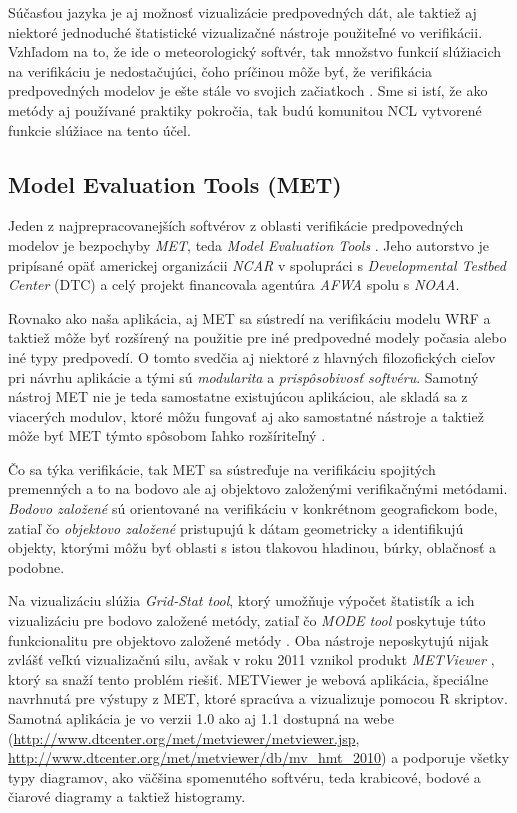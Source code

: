 Súčasťou jazyka je aj možnosť vizualizácie predpovedných dát, ale taktiež aj niektoré jednoduché štatistické vizualizačné nástroje použiteľné vo verifikácii. Vzhľadom na to, že ide o meteorologický softvér, tak množstvo funkcií slúžiacich na verifikáciu je nedostačujúci, čoho príčinou môže byť, že verifikácia predpovedných modelov je ešte stále vo svojich začiatkoch \cite{VerifSoft}. Sme si istí, že ako metódy aj používané praktiky pokročia, tak budú komunitou NCL vytvorené funkcie slúžiace na tento účel.

\subsection[MET]{Model Evaluation Tools (MET)}
Jeden z najprepracovanejších softvérov z oblasti verifikácie predpovedných modelov je bezpochyby \textit{MET}, teda \textit{Model Evaluation Tools} \cite{MET}. Jeho autorstvo je pripísané opäť americkej organizácii \textit{NCAR} v spolupráci s \textit{Developmental Testbed Center} (DTC) a celý projekt financovala agentúra \textit{AFWA} spolu s \textit{NOAA}.

Rovnako ako naša aplikácia, aj MET sa sústredí na verifikáciu modelu WRF a taktiež môže byť rozšírený na použitie pre iné predpovedné modely počasia alebo iné typy predpovedí. O tomto svedčia aj niektoré z hlavných filozofických cieľov pri návrhu aplikácie a tými sú \textit{modularita} a \textit{prispôsobivosť softvéru}. Samotný nástroj MET nie je teda samostatne existujúcou aplikáciou, ale skladá sa z viacerých modulov, ktoré môžu fungovať aj ako samostatné nástroje a taktiež môže byť MET týmto spôsobom ľahko rozšíriteľný \cite{METuserguide}. 

Čo sa týka verifikácie, tak MET sa sústreďuje na verifikáciu spojitých premenných a to na bodovo ale aj objektovo založenými verifikačnými metódami. \textit{Bodovo založené} sú orientované na verifikáciu v konkrétnom geografickom bode, zatiaľ čo \textit{objektovo založené} pristupujú k dátam geometricky a identifikujú objekty, ktorými môžu byť oblasti s istou tlakovou hladinou, búrky, oblačnosť a podobne.

Na vizualizáciu slúžia \textit{Grid-Stat tool}, ktorý umožňuje výpočet štatistík a ich vizualizáciu pre bodovo založené metódy, zatiaľ čo \textit{MODE tool} poskytuje túto funkcionalitu pre objektovo založené metódy \cite{METuserguide}. Oba nástroje neposkytujú nijak zvlášť veľkú vizualizačnú silu, avšak v roku 2011 vznikol produkt \textit{METViewer} \cite{METviewer}, ktorý sa snaží tento problém riešiť. METViewer je webová aplikácia, špeciálne navrhnutá pre výstupy z MET, ktoré spracúva a vizualizuje pomocou R skriptov.  Samotná aplikácia je vo verzii 1.0 ako aj 1.1 dostupná na webe (\url{http://www.dtcenter.org/met/metviewer/metviewer.jsp},  \url{http://www.dtcenter.org/met/metviewer/db/mv_hmt_2010}) a podporuje všetky typy diagramov, ako väčšina spomenutého softvéru, teda krabicové, bodové a čiarové diagramy a taktiež histogramy.

